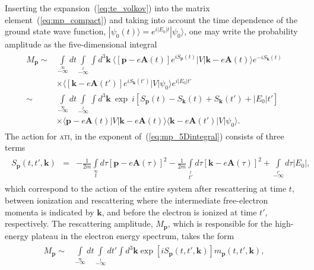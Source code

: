 Inserting the expansion~(\ref{eq:te_volkov}) into the matrix
element~(\ref{eq:mp_compact}) and taking into account the time
dependence of the ground state wave function, $|\psi_{0}(t) \rangle =
e^{i|E_{0}|t} | \psi_{0} \rangle$, one may write the probability
amplitude as the five-dimensional integral~\cite{KopoldOptComm2000}
%
\begin{eqnarray}
  \label{eq:mp_5Dintegral}
  \begin{split}
    M_{\mathbf{p}} \sim & \int\limits_{-\infty}\limits^{\infty} dt
    \int\limits_{-\infty}\limits^{t} \int d^{3}\mathbf{k}\ 
    \langle [\mathbf{p} - e\mathbf{A}(t)] e^{iS_{\mathbf{p}}(t)} | V |
    \mathbf{k} - e\mathbf{A}(t) \rangle e^{-iS_{\mathbf{k}}(t)} \\
    & \times
    \langle [\mathbf{k} - e\mathbf{A}(t')] e^{iS_{\mathbf{k}}(t')} | V |
    \psi_{0} \rangle e^{i|E_{0}|t'} \\
    \sim &
    \int\limits_{-\infty}\limits^{\infty} dt
    \int\limits_{-\infty}\limits^{t} \int d^{3}\mathbf{k}\ 
    \exp\ i\left[ S_{\mathbf{p}}(t) - S_{\mathbf{k}}(t)
      + S_{\mathbf{k}}(t') + |E_{0}|t' \right] \\
    & \times
    \langle \mathbf{p} - e\mathbf{A}(t) | V |
    \mathbf{k} - e\mathbf{A}(t) \rangle 
    \langle \mathbf{k} - e\mathbf{A}(t') | V |
    \psi_{0} \rangle.
  \end{split}
\end{eqnarray}
%
The action for \textsc{ati}, in the exponent
of~(\ref{eq:mp_5Dintegral}) consists of three terms
%
\begin{eqnarray}
  \label{eq:action_mpintegral}
  \begin{split}
    S_{\mathbf{p}}(t, t', \mathbf{k}) & = & - \frac{1}{2m}
    \int\limits_{t}\limits^{\infty} d\tau [\mathbf{p} - e\mathbf{A}(\tau)]^{2}
    - \frac{1}{2m} \int\limits_{t'}\limits^{t} d\tau [\mathbf{k} - e\mathbf{A}(\tau)]^{2}
    + \int\limits_{-\infty}\limits^{t'} d\tau |E_{0}|,
  \end{split}
\end{eqnarray}
%
which correspond to the action of the entire system after rescattering
at time $t$, between ionization and rescattering where the
intermediate free-electron momenta is indicated by $\mathbf{k}$, and
before the electron is ionized at time $t'$, respectively. The
rescattering amplitude, $M_{\mathbf{p}}$, which is responsible for the
high-energy plateau in the electron energy spectrum, takes the
form~\cite{Becker_ati2002,BeckerTEOp_2006}
%
\begin{eqnarray}
\label{eq:mp_final}
\begin{split}
M_{\mathbf{p}} \sim &
\int\limits_{-\infty}\limits^{\infty} dt
\int\limits_{-\infty}\limits^{t} dt'
\int d^{3}\mathbf{k} \exp \left[ iS_{\mathbf{p}}(t, t', \mathbf{k}) \right]
m_{\mathbf{p}}(t, t', \mathbf{k}),
\end{split}
\end{eqnarray}
